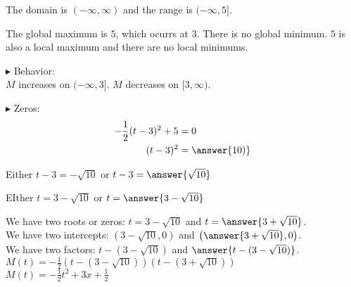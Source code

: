 \documentclass{ximera}
\begin{document}
\begin{example}
\begin{explanation}
\begin{image}
\end{image}



The domain is $(-\infty, \infty)$ and the range is $(-\infty, 5]$.

The global maximum is $5$, which ocurrs at $3$.  There is no global minimum.  $5$ is also a local maximum and there are no local minimums.




$\blacktriangleright$ Behavior: \\


$M$ increases on $(-\infty, 3]$. $M$ decreases on $[3, \infty)$.



$\blacktriangleright$ Zeros: \\





\begin{align*}
-\frac{1}{2} (t-3)^2 + 5 & = 0  \\
(t-3)^2     &= \answer{10)} 
\end{align*}

Either $t - 3 = -\sqrt{10}$ or $t - 3 = \answer{\sqrt{10}}$

EIther $t = 3 - \sqrt{10}$ or $t = \answer{3 - \sqrt{10}}$






We have two roots or zeros: $t = 3 - \sqrt{10}$ and $t = \answer{3 + \sqrt{10}}$. \\


We have two intercepts: $(3 - \sqrt{10}, 0)$ and $\left( \answer{3 + \sqrt{10}}, 0 \right)$. \\


We have two factors: $t - (3 - \sqrt{10})$ and $\answer{t - (3 - \sqrt{10})}$. \\


$M(t) = -\frac{1}{2} (t - (3 - \sqrt{10})) (t - (3 + \sqrt{10}))$ \\

$M(t) =  -\frac{1}{2} t^2 + 3x + \frac{1}{2}$


\end{explanation}

\end{example}
\end{document}
